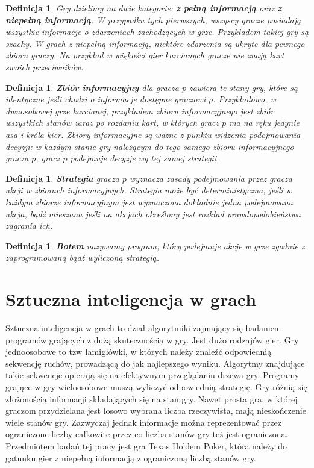 \documentclass[licencjacka]{pracamgr}
\newtheorem{definition}[theorem]{Definicja}
\begin{document}
\begin{definition}
      Gry dzielimy na dwie kategorie: \textbf{z pełną informacją} oraz \textbf{z niepełną informacją}.
      W przypadku tych pierwszych, wszyscy gracze posiadają wszystkie informacje o zdarzeniach
      zachodzących w grze. Przykładem takiej gry są szachy. W grach z niepełną informacją, niektóre
      zdarzenia są ukryte dla pewnego zbioru graczy. Na przykład w więkości gier karcianych gracze
      nie znają kart swoich przeciwników.
\end{definition}

\begin{definition}
      \textbf{Zbiór informacyjny} dla gracza $p$ zawiera te stany gry, które są identyczne jeśli chodzi
      o informacje dostępne graczowi $p$. Przykładowo, w dwuosobowej grze karcianej, przykładem zbioru informacyjnego
      jest zbiór wszystkich stanów zaraz po rozdaniu kart, w których gracz $p$ ma na ręku jedynie asa i króla kier.
      Zbiory informacyjne są ważne z punktu widzenia podejmowania decyzji: w każdym stanie gry należącym do tego
      samego zbioru informacyjnego gracza $p$, gracz $p$ podejmuje decyzje wg tej samej strategii.
\end{definition}

\begin{definition}
      \textbf{Strategia} gracza $p$ wyznacza zasady podejmowania przez gracza akcji w zbiorach informacyjnych.
      Strategia może być deterministyczna, jeśli w każdym zbiorze informacyjnym jest wyznaczona dokładnie
      jedna podejmowana akcja, bądź mieszana jeśli na akcjach określony jest rozkład prawdopodobieństwa
      zagrania ich.
\end{definition}

\begin{definition}
      \textbf{Botem} nazywamy program, który podejmuje akcje w grze zgodnie z zaprogramowaną bądź wyliczoną strategią.
\end{definition}

\section{Sztuczna inteligencja w grach}

Sztuczna inteligencja w grach to dział algorytmiki zajmujący się badaniem programów grających
z dużą skutecznością w gry. Jest dużo rodzajów gier. Gry jednoosobowe to tzw łamigłówki, w których
należy znaleźć odpowiednią sekwencję ruchów, prowadzącą do jak najlepszego wyniku. Algorytmy znajdujące
takie sekwencje opierają się na efektywnym przeglądaniu drzewa gry. Programy grające w gry wieloosobowe
muszą wyliczyć odpowiednią strategię. Gry różnią się złożonością informacji składających się na stan gry.
Nawet prosta gra, w której graczom przydzielana jest losowo wybrana liczba rzeczywista, mają nieskończenie
wiele stanów gry. Zazwyczaj jednak informacje można reprezentować przez ograniczone liczby całkowite przez co
liczba stanów gry też jest ograniczona. Przedmiotem badań tej pracy jest gra Texas Holdem Poker, która
należy do gatunku gier z niepełną informacją z ograniczoną liczbą stanów gry.
\end{document}
